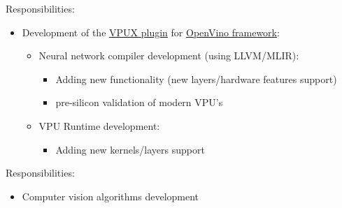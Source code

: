 \documentclass[a4paper,11pt]{memoir}
\newif\ifdetailed
\begin{document}
{
Responsibilities:
\begin{itemize}
	\item Development of the \href{https://github.com/openvinotoolkit/vpux-plugin}{VPUX plugin} for \href{https://github.com/openvinotoolkit/openvino}{OpenVino framework}:
	\begin{itemize}
		\item Neural network compiler development (using LLVM/MLIR):
		\begin{itemize}
			\item Adding new functionality (new layers/hardware features support)
			\item pre-silicon validation of modern VPU's
		\end{itemize}
		\item VPU Runtime development:
		\begin{itemize}
			\item Adding new kernels/layers support
		\end{itemize}
	\end{itemize}	
\end{itemize}
\ifdetailed
Detailed achievements:
\begin{itemize}
	\item Learned:
	\begin{itemize} 
		\item Vision Processing Unit perfomance
		\item neural networks perfomance on deep level
		\item neural networks compilers perfomance
		\item VPU runtime
	\end{itemize}
	\item Participated in the creation/development of the framework for pre-silicon validation
	\item Ensured all hardware features of VPU are tested on pre-silicon stage
\end{itemize}
\fi
}

{
Responsibilities:
\begin{itemize}
	\item Computer vision algorithms development
\end{itemize}
\ifdetailed
Detailed achievements:
\begin{itemize}
	\item Developed a palms veins pattern matching algorithm for \href{https://en.kalashnikovgroup.ru/media/perspektivnye-razrabotki/kontsern-kalashnikov-predstavil-sobstvennyy-biometricheskiy-skaner}{biometrical \mbox{scanner}}
\end{itemize}
\fi
}
\end{document}
